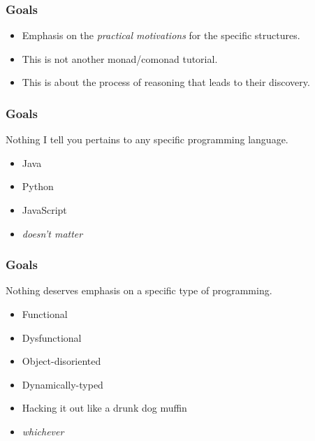 \begin{frame}
\frametitle{Goals}
\begin{itemize}
\item<1-> Emphasis on the \emph{practical motivations} for the specific structures.
\item<2-> This is not another monad/comonad tutorial.
\item<3-> This is about the process of reasoning that leads to their discovery.
\end{itemize}
\end{frame}

\begin{frame}
\frametitle{Goals}
\begin{block}{Nothing I tell you pertains to any specific programming language.}
\begin{itemize}
\item Java
\item Python
\item JavaScript
\item \emph{doesn't matter}
\end{itemize}
\end{block}
\end{frame}

\begin{frame}
\frametitle{Goals}
\begin{block}{Nothing deserves emphasis on a specific type of programming.}
\begin{itemize}
\item Functional
\item Dysfunctional
\item Object-disoriented
\item Dynamically-typed
\item Hacking it out like a drunk dog muffin
\item \emph{whichever}
\end{itemize}
\end{block}
\end{frame}
